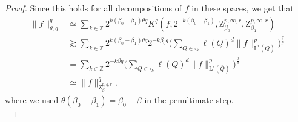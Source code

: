 \documentclass[11pt, leqno,parskip=half]{amsart}
\theoremstyle{definition}
\newcommand{\IZ}{\mathbb{Z}}
\renewcommand{\L}{\mathrm{L}}
\newcommand{\Z}{\mathrm{Z}}
\numberwithin{equation}{section}
\begin{document}
\begin{proof}
    Since this holds for all decompositions of $f$ in these spaces, we get that
    \begin{align*}
        \|f\|^q_{\theta,q}&\simeq\sum\limits_{k\in\IZ} 2^{k(\beta_0-\beta_1)\theta q} K^q(f,2^{-k(\beta_0-\beta_1)},\Z^{p,\infty,r}_{\beta_0} , \Z^{p,\infty,r}_{\beta_1})\\
        &\gtrsim \sum\limits_{k\in\IZ} 2^{k(\beta_0-\beta_1)\theta q} 2^{- k\beta_0q}\bigg(\sum\limits_{Q\in\square_k} \ell(Q)^d \|f\|_{\L^r(\bar Q)}^p\bigg)^\frac{q}{p}\\
        &=\sum\limits_{k\in\IZ}  2^{- k\beta q}\bigg(\sum\limits_{Q\in\square_k} \ell(Q)^d \|f\|_{\L^r(\bar Q)}^p\bigg)^\frac{q}{p}\\
        &\simeq \|f\|_{\Z^{p,q,r}_\beta}^q,
    \end{align*}
    where we used $\theta(\beta_0-\beta_1) = \beta_0-\beta$ in the penultimate step.\\


\end{proof}
\end{document}
